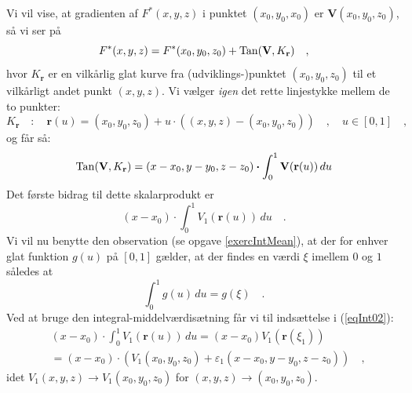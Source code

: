 \begin{bevis}
Vi vil vise, at gradienten af $F^{*}(x,y,z)$ i punktet $(x_{0}, y_{0}, x_{0})$ er $\mathbf{V}(x_{0},y_{0},z_{0})$, så vi ser på
\begin{equation}\label{eqInt00}
F^{*}(x,y,z) = F^{*}(x_{0}, y_{0}, z_{0}) + \operatorname{Tan}(\mathbf{V}, K_{\mathbf{r}}) \quad,
\end{equation}
hvor $K_{\mathbf{r}}$ er en vilkårlig glat kurve fra (udviklings-)punktet $(x_{0}, y_{0}, z_{0})$ til et vilkårligt andet punkt $(x,y,z)$.
Vi vælger \emph{igen} det rette linjestykke mellem de to punkter:
\begin{equation}
K_{\mathbf{r}} \quad : \quad \mathbf{r}(u) = (x_{0}, y_{0}, z_{0}) + u\cdot ((x,y,z) - (x_{0}, y_{0}, z_{0})) \quad , \quad u \in [0,  1] \quad ,
\end{equation}
 og får så:
\begin{equation}\label{eqInt01}
\operatorname{Tan}(\mathbf{V}, K_{\mathbf{r}}) = (x-x_{0}, y-y_{0}, z-z_{0}) \bm{\cdot} \int_{0}^{1} \mathbf{V}(\mathbf{r}(u)) \, du
\end{equation}
Det første bidrag til dette skalarprodukt er
\begin{equation} \label{eqInt02}
(x-x_{0}) \cdot \int_{0}^{1} V_{1}(\mathbf{r}(u)) \, du \quad .
\end{equation}
Vi vil nu benytte den observation (se opgave \ref{exercIntMean}), at der for enhver glat funktion $g(u)$ på $[0, 1]$ gælder, at
der findes en værdi $\xi$ imellem $0$ og $1$ således at
\begin{equation}
\int_{0}^{1} g(u) \, du = g(\xi) \quad .
\end{equation}
Ved at bruge den integral-middelværdisætning får vi til indsættelse i (\ref{eqInt02}):
\begin{equation}
\begin{aligned}
&(x-x_{0}) \cdot \int_{0}^{1} V_{1}(\mathbf{r}(u)) \, du = (x-x_{0}) V_{1}(\mathbf{r}(\xi_{1})) \\
&= (x-x_{0}) \cdot \left(V_{1}(x_{0}, y_{0}, z_{0}) + \varepsilon_{1}(x-x_{0}, y-y_{0}, z-z_{0})\right) \quad ,
\end{aligned}
\end{equation}
idet $V_{1}(x, y, z) \to V_{1}(x_{0}, y_{0}, z_{0})$ for $(x,y,z) \to (x_{0}, y_{0}, z_{0})$. \\


\end{bevis}
